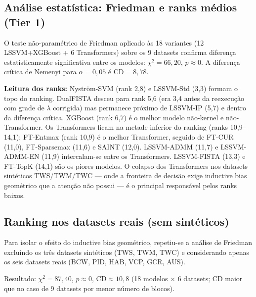 \documentclass[12pt,a4paper]{article}
\begin{document}
\subsection{Análise estatística: Friedman e ranks médios (Tier 1)}
\label{sec:tier1_friedman}

O teste não-paramétrico de Friedman aplicado às 18 variantes (12 LSSVM+XGBoost
+ 6 Transformers) sobre os 9 datasets confirma diferença estatisticamente
significativa entre os modelos: $\chi^2 = 66{,}20$, $p \approx 0$. A diferença
crítica de Nemenyi para $\alpha = 0{,}05$ é $\text{CD} = 8{,}78$.



\textbf{Leitura dos ranks:} Nyström-SVM (rank 2,8) e LSSVM-Std (3,3) formam
o topo do ranking. DualFISTA desceu para rank 5,6 (era 3,4 antes da reexecução
com grade de $\lambda$ corrigida) mas permanece próximo de LSSVM-IP (5,7) e
dentro da diferença crítica. XGBoost (rank 6,7) é o melhor modelo não-kernel
e não-Transformer. Os Transformers ficam na metade inferior do ranking
(ranks 10,9--14,1): FT-Entmax (rank 10,9) é o melhor Transformer, seguido
de FT-CUR (11,0), FT-Sparsemax (11,6) e SAINT (12,0). LSSVM-ADMM (11,7) e
LSSVM-ADMM-EN (11,9) intercalam-se entre os Transformers. LSSVM-FISTA (13,3)
e FT-TopK (14,1) são os piores modelos. O colapso dos Transformers nos
datasets sintéticos TWS/TWM/TWC --- onde a fronteira de decisão exige
inductive bias geométrico que a atenção não possui --- é o principal
responsável pelos ranks baixos.

\subsection{Ranking nos datasets reais (sem sintéticos)}
\label{sec:tier1_friedman_real}

Para isolar o efeito do inductive bias geométrico, repetiu-se a análise de
Friedman excluindo os três datasets sintéticos (TWS, TWM, TWC) e considerando
apenas os seis datasets reais (BCW, PID, HAB, VCP, GCR, AUS).

Resultado: $\chi^2 = 87{,}40$, $p \approx 0$, $\text{CD} \approx 10{,}8$
(18 modelos $\times$ 6 datasets; CD maior que no caso de 9 datasets por menor
número de blocos).
\end{document}
